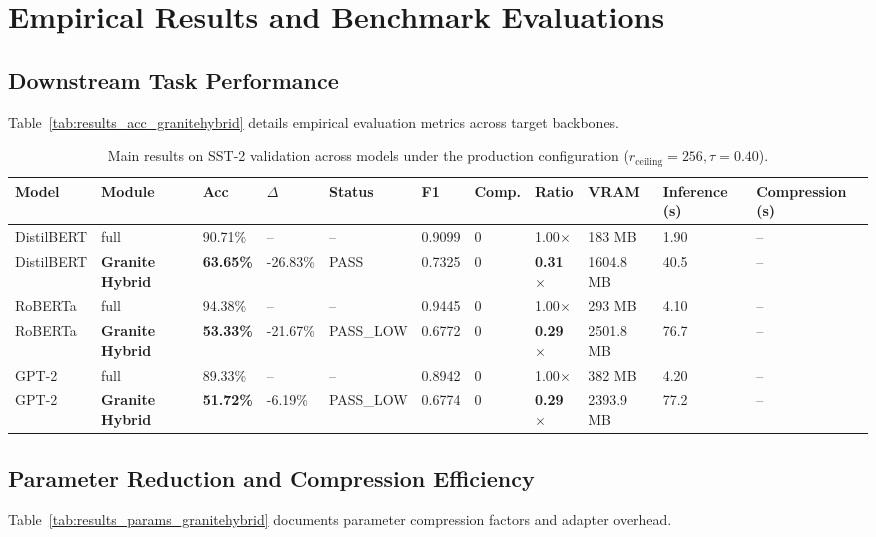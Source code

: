 \section{Empirical Results and Benchmark Evaluations}

\subsection{Downstream Task Performance}
Table~\ref{tab:results_acc_granitehybrid} details empirical evaluation metrics across target backbones.

\begin{table}[t]
\centering
\small
\begin{tabular}{lllllllllll}
\toprule
\textbf{Model} & \textbf{Module} & \textbf{Acc} & \textbf{$\Delta$} & \textbf{Status} & \textbf{F1} & \textbf{Comp.} & \textbf{Ratio} & \textbf{VRAM} & \textbf{Inference (s)} & \textbf{Compression (s)} \\
\midrule
DistilBERT & full & 90.71\% & -- & -- & 0.9099 & 0 & 1.00$\times$ & 183 MB & 1.90 & -- \\
DistilBERT & \textbf{Granite Hybrid} & \textbf{63.65\%} & -26.83\% & PASS & 0.7325 & 0 & \textbf{0.31$\times$} & 1604.8 MB & 40.5 & -- \\
RoBERTa & full & 94.38\% & -- & -- & 0.9445 & 0 & 1.00$\times$ & 293 MB & 4.10 & -- \\
RoBERTa & \textbf{Granite Hybrid} & \textbf{53.33\%} & -21.67\% & PASS_LOW & 0.6772 & 0 & \textbf{0.29$\times$} & 2501.8 MB & 76.7 & -- \\
GPT-2 & full & 89.33\% & -- & -- & 0.8942 & 0 & 1.00$\times$ & 382 MB & 4.20 & -- \\
GPT-2 & \textbf{Granite Hybrid} & \textbf{51.72\%} & -6.19\% & PASS_LOW & 0.6774 & 0 & \textbf{0.29$\times$} & 2393.9 MB & 77.2 & -- \\
\bottomrule
\end{tabular}
\caption{Main results on SST-2 validation across models under the production configuration ($r_{\mathrm{ceiling}}=256, \tau=0.40$).}
\label{tab:main_sst2}
\end{table}

\subsection{Parameter Reduction and Compression Efficiency}
Table~\ref{tab:results_params_granitehybrid} documents parameter compression factors and adapter overhead.

